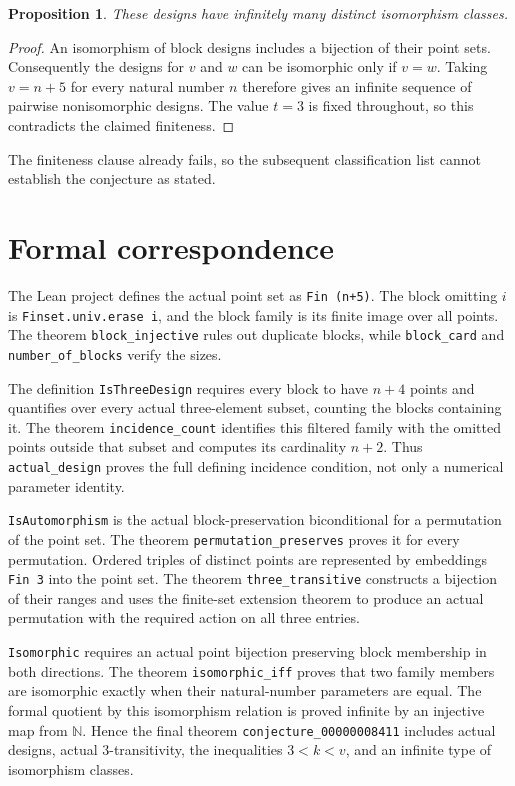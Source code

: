\documentclass[11pt,a4paper]{article}
\newtheorem{proposition}{Proposition}
\begin{document}
\newpage
\begin{proposition}
These designs have infinitely many distinct isomorphism classes.
\end{proposition}
\begin{proof}
An isomorphism of block designs includes a bijection of their point
sets. Consequently the designs for $v$ and $w$ can be isomorphic only
if $v=w$. Taking $v=n+5$ for every natural number $n$ therefore gives
an infinite sequence of pairwise nonisomorphic designs. The value
$t=3$ is fixed throughout, so this contradicts the claimed finiteness.
\end{proof}

The finiteness clause already fails, so the subsequent classification
list cannot establish the conjecture as stated.

\section{Formal correspondence}
\raggedright
The Lean project defines the actual point set as \texttt{Fin (n+5)}.
The block omitting $i$ is \texttt{Finset.univ.erase i}, and the block
family is its finite image over all points. The theorem
\texttt{block\_injective} rules out duplicate blocks, while
\texttt{block\_card} and \texttt{number\_of\_blocks} verify the sizes.

The definition \texttt{IsThreeDesign} requires every block to have
$n+4$ points and quantifies over every actual three-element subset,
counting the blocks containing it. The theorem
\texttt{incidence\_count} identifies this filtered family with the
omitted points outside that subset and computes its cardinality $n+2$.
Thus \texttt{actual\_design} proves the full defining incidence
condition, not only a numerical parameter identity.

\texttt{IsAutomorphism} is the actual block-preservation biconditional
for a permutation of the point set. The theorem
\texttt{permutation\_preserves} proves it for every permutation.
Ordered triples of distinct points are represented by embeddings
\texttt{Fin 3} into the point set. The theorem
\texttt{three\_transitive} constructs a bijection of their ranges and
uses the finite-set extension theorem to produce an actual permutation
with the required action on all three entries.

\texttt{Isomorphic} requires an actual point bijection preserving
block membership in both directions. The theorem
\texttt{isomorphic\_iff} proves that two family members are isomorphic
exactly when their natural-number parameters are equal.
The formal quotient by this isomorphism relation is proved infinite
by an injective map from $\mathbb N$. Hence the final theorem
\texttt{conjecture\_00000008411} includes actual designs, actual
$3$-transitivity, the inequalities $3<k<v$, and an infinite type of
isomorphism classes.
\end{document}
